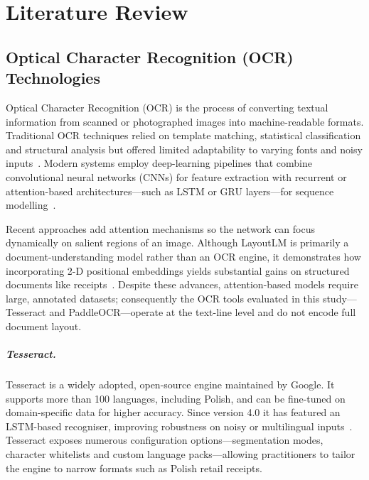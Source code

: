 \documentclass{SGGW-thesis-EN}
\begin{document}
\chapter{Literature Review}

\section{Optical Character Recognition (OCR) Technologies}

Optical Character Recognition (OCR) is the process of converting textual information
from scanned or photographed images into machine-readable formats.
Traditional OCR techniques relied on template matching, statistical classification and
structural analysis but offered limited adaptability to varying fonts and noisy inputs~\cite{ocrsystems}.
Modern systems employ deep-learning pipelines that combine convolutional neural networks
(CNNs) for feature extraction with recurrent or attention-based architectures—such as
LSTM or GRU layers—for sequence modelling~\cite{shi2017e2eseq}.

Recent approaches add attention mechanisms so the network can focus dynamically on
salient regions of an image.
Although LayoutLM is primarily a document-understanding model rather than an OCR engine,
it demonstrates how incorporating 2-D positional embeddings yields substantial gains on
structured documents like receipts~\cite{li2020layoutlm}.
Despite these advances, attention-based models require large, annotated datasets;
consequently the OCR tools evaluated in this study—Tesseract and PaddleOCR—operate at the
text-line level and do not encode full document layout.

\paragraph{Tesseract.}
Tesseract is a widely adopted, open-source engine maintained by Google.
It supports more than 100 languages, including Polish, and can be fine-tuned on
domain-specific data for higher accuracy.
Since version 4.0 it has featured an LSTM-based recogniser, improving robustness on
noisy or multilingual inputs~\cite{smith2007overview,smith2013history}.
Tesseract exposes numerous configuration options—segmentation modes, character
whitelists and custom language packs—allowing practitioners to tailor the engine to
narrow formats such as Polish retail receipts.
\end{document}
